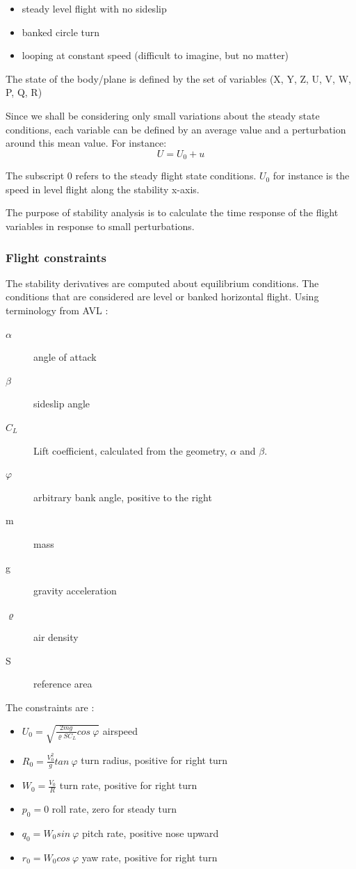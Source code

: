 \documentclass[a4paper,twoside,12pt,dvips]{article}
\begin{document}
\begin{itemize}
\item steady level flight with no sideslip
\item banked circle turn
\item looping at constant speed (difficult to imagine, but no
matter)
\end{itemize}

The state of the body/plane is defined by the set of variables (X, Y, Z,
U, V, W, P, Q, R)

Since we shall be considering only small variations about the steady
state conditions, each variable can be defined by an average value and
a perturbation around this mean value. For instance: \[U = U_0 + u\]

The subscript 0 refers to the steady flight state conditions.
$U_0$ for instance is the speed in level flight along the
stability x-axis.

The purpose of stability analysis is to calculate the time response of
the flight variables in response to small perturbations.

\subsubsection{Flight constraints}

The stability derivatives are computed about equilibrium conditions. The
conditions that are considered are level or banked horizontal flight.
Using terminology from AVL :

\begin{description}
\item[$\alpha$] angle of attack
\item[$\beta$] sideslip angle
\item[$C_L$] Lift coefficient, calculated from the geometry,
$\alpha$ and $\beta$.
\item[$\varphi$] arbitrary bank angle, positive to the right
\item[m] mass
\item[g] gravity acceleration
\item[$\varrho$] air density
\item[S] reference area
\end{description}

The constraints are :

\begin{itemize}
\item $U_0 = \sqrt{\frac{2mg}{\varrho SC_L} cos~\varphi}$ airspeed
\item $R_0 = \frac{V_0^2}{g}tan~\varphi$ turn radius, positive for right turn
\item $W_0 = \frac{V_0}{R}$ turn rate, positive for right turn
\item $p_0 = 0$ roll rate, zero for steady turn
\item $q_0 = W_0 sin~\varphi$ pitch rate, positive nose upward
\item $r_0 = W_0 cos~\varphi$ yaw rate, positive for right turn
\end{itemize}
\end{document}
